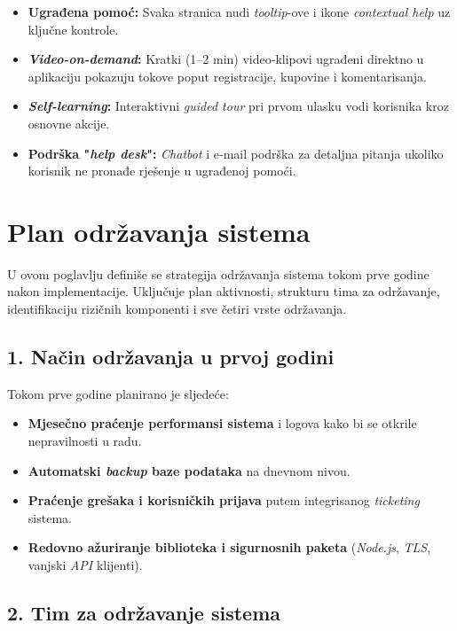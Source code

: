 \begin{itemize}
  \item \textbf{Ugrađena pomoć:} Svaka stranica nudi \emph{tooltip}-ove i ikone \emph{contextual help} uz ključne kontrole.
  \item \textbf{\emph{Video-on-demand}:} Kratki (1–2 min) video‐klipovi ugrađeni direktno u aplikaciju pokazuju tokove poput registracije, kupovine i komentarisanja.
  \item \textbf{\emph{Self-learning}:} Interaktivni \emph{guided tour} pri prvom ulasku vodi korisnika kroz osnovne akcije.
  \item \textbf{Podrška "\emph{help desk}":} \emph{Chatbot} i e‐mail podrška za detaljna pitanja ukoliko korisnik ne pronađe rješenje u ugrađenoj pomoći.
\end{itemize}

\sloppy
\section{Plan održavanja sistema}


U ovom poglavlju definiše se strategija održavanja sistema tokom prve godine nakon implementacije. Uključuje plan aktivnosti, strukturu tima za održavanje, identifikaciju rizičnih komponenti i sve četiri vrste održavanja.

\subsection*{1. Način održavanja u prvoj godini}

Tokom prve godine planirano je sljedeće:

\begin{itemize}
  \item \textbf{Mjesečno praćenje performansi sistema} i logova kako bi se otkrile nepravilnosti u radu.
  \item \textbf{Automatski \emph{backup} baze podataka} na dnevnom nivou.
  \item \textbf{Praćenje grešaka i korisničkih prijava} putem integrisanog \emph{ticketing} sistema.
  \item \textbf{Redovno ažuriranje biblioteka i sigurnosnih paketa} (\emph{Node.js}, \emph{TLS}, vanjski \emph{API} klijenti).
\end{itemize}

\subsection*{2. Tim za održavanje sistema}

